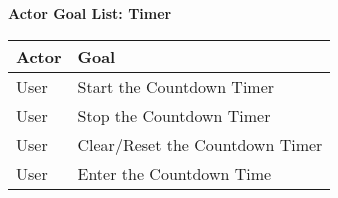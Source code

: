 \documentclass[letterpaper]{article}
\begin{document}
\noindent
\begin{center}
\textbf{Actor Goal List:  Timer}

\vspace{2ex}
\begin{tabular}{|p{3.5cm}|p{5cm}|}\hline
\textbf{Actor} & \textbf{Goal}\\\hline
User & Start the Countdown Timer\\\hline
User & Stop the Countdown Timer\\\hline
User & Clear/Reset the Countdown Timer\\\hline
User & Enter the Countdown Time\\\hline
\end{tabular}
\end{center}
\end{document}
